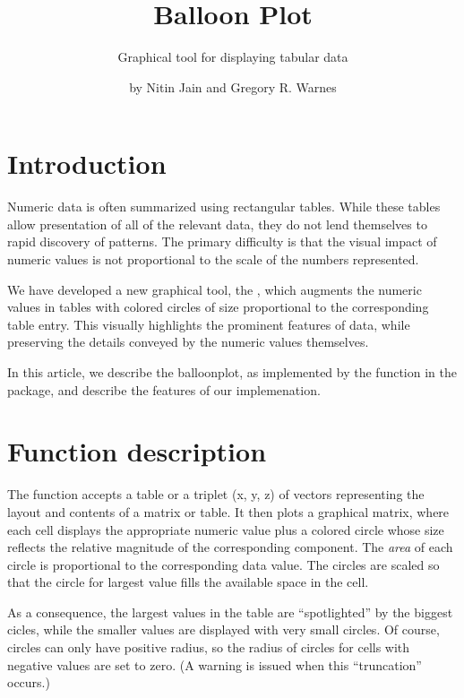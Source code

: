 \documentclass[a4paper]{report}
\begin{document}
\begin{article}
\author{by Nitin Jain and Gregory R. Warnes}
\title{Balloon Plot}
\subtitle{Graphical tool for displaying tabular data}

\maketitle

\section*{Introduction}

Numeric data is often summarized using rectangular tables. While
these tables allow presentation of all of the relevant data, they do
not lend themselves to rapid discovery of patterns. The
primary difficulty is that the visual impact of numeric values is
not proportional to the scale of the numbers represented.

We have developed a new graphical tool, the ,
which augments the numeric values in tables with colored circles of
size proportional to the corresponding table entry. This visually
highlights the prominent features of data, while preserving the
details conveyed by the numeric values themselves.

In this article, we describe the balloonplot, as
implemented by the  function in the
 package, and describe the features of our
implemenation.


\section*{Function description}

The function  accepts a table or a triplet (x,
y, z) of vectors representing the layout and contents of a matrix or
table.  It then plots a graphical matrix, where each cell displays
the appropriate numeric value plus a colored circle whose size
reflects the relative magnitude of the corresponding component. The
\emph{area} of each circle is proportional to the corresponding data
value. The circles are scaled so that the circle for largest value
fills the available space in the cell.

As a consequence, the largest values in the table are ``spotlighted''
by the biggest cicles, while the smaller values are displayed
with very small circles.  Of course, circles can only have positive
radius, so the radius of circles for cells with negative values are
set to zero.  (A warning is issued when this ``truncation'' occurs.)


\end{article}
\end{document}
